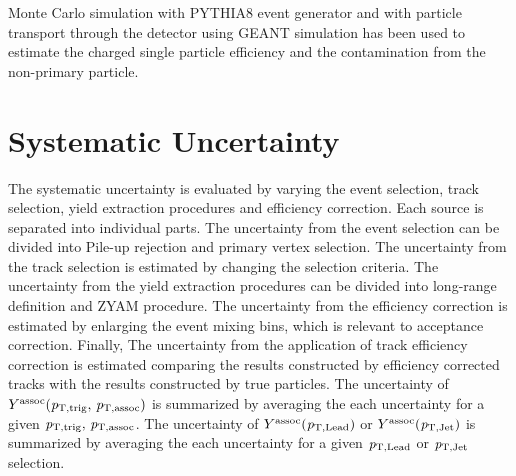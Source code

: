 Monte Carlo simulation with PYTHIA8 event generator and with particle transport through the detector using GEANT simulation has been used to estimate the charged single particle efficiency and the contamination from the non-primary particle. 


\section{Systematic Uncertainty}
\label{sec:uncertainties}
The systematic uncertainty is evaluated by varying the event selection, track selection, yield extraction procedures and efficiency correction. Each source is separated into individual parts. The uncertainty from the event selection can be divided into Pile-up rejection and primary vertex selection. The uncertainty from the track selection is estimated by changing the selection criteria. The uncertainty from the yield extraction procedures can be divided into long-range definition and ZYAM procedure. The uncertainty from the efficiency correction is estimated by enlarging the event mixing bins, which is relevant to acceptance correction. Finally, The uncertainty from the application of track efficiency correction is estimated comparing the results constructed by efficiency corrected tracks with the results constructed by true particles. The uncertainty of $Y^{\rm{assoc}}(\it{p}_{\rm{T, trig}},\,\it{p}_{\rm{T, assoc}})$ is summarized by averaging the each uncertainty for a given $\it{p}_{\rm{T, trig}},\,\it{p}_{\rm{T, assoc}}$. The uncertainty of $Y^{\rm{assoc}}(\it{p}_{\rm{T, Lead}})$ or $Y^{\rm{assoc}}(\it{p}_{\rm{T, Jet}})$ is summarized by averaging the each uncertainty for a given $\it{p}_{\rm{T, Lead}}$ or $\it{p}_{\rm{T, Jet}}$ selection.
